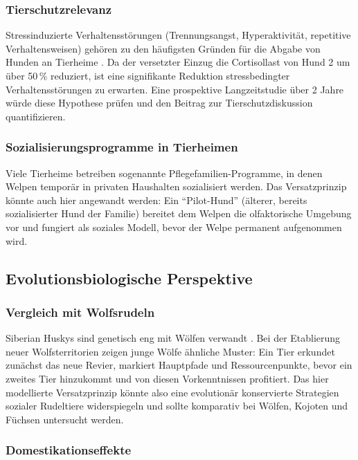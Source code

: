 ﻿\documentclass[12pt, a4paper]{article}
\theoremstyle{plain}
\theoremstyle{definition}
\theoremstyle{remark}
\begin{document}
\subsubsection{Tierschutzrelevanz}

Stressinduzierte Verhaltensstörungen (Trennungsangst, Hyperaktivität,
repetitive Verhaltensweisen) gehören zu den häufigsten Gründen für die
Abgabe von Hunden an Tierheime \cite{reisner1994usefulness}. Da der
versetzter Einzug die Cortisollast von Hund 2 um über 50\,\% reduziert,
ist eine signifikante Reduktion stressbedingter Verhaltensstörungen zu
erwarten. Eine prospektive Langzeitstudie über 2 Jahre würde diese Hypothese
prüfen und den Beitrag zur Tierschutzdiskussion quantifizieren.

\subsubsection{Sozialisierungsprogramme in Tierheimen}

Viele Tierheime betreiben sogenannte Pflegefamilien-Programme, in denen
Welpen temporär in privaten Haushalten sozialisiert werden. Das
Versatzprinzip könnte auch hier angewandt werden: Ein ``Pilot-Hund'' (älterer,
bereits sozialisierter Hund der Familie) bereitet dem Welpen die olfaktorische
Umgebung vor und fungiert als soziales Modell, bevor der Welpe permanent
aufgenommen wird.

\subsection{Evolutionsbiologische Perspektive}

\subsubsection{Vergleich mit Wolfsrudeln}

Siberian Huskys sind genetisch eng mit Wölfen verwandt \cite{vonholdt2010genome}.
Bei der Etablierung neuer Wolfsterritorien zeigen junge Wölfe ähnliche
Muster: Ein Tier erkundet zunächst das neue Revier, markiert Hauptpfade und
Ressourcenpunkte, bevor ein zweites Tier hinzukommt und von diesen
Vorkenntnissen profitiert. Das hier modellierte Versatzprinzip könnte also
eine evolutionär konservierte Strategien sozialer Rudeltiere widerspiegeln
und sollte komparativ bei Wölfen, Kojoten und Füchsen untersucht werden.

\subsubsection{Domestikationseffekte}
\end{document}
